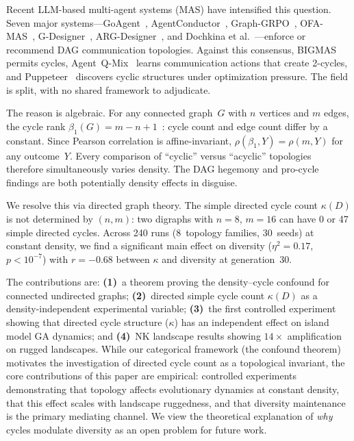 \documentclass{llncs}
\begin{document}
Recent LLM-based multi-agent systems (MAS) have intensified this question.
Seven major systems---GoAgent~\cite{goagent2026},
AgentConductor~\cite{agentconductor2026}, Graph-GRPO~\cite{graphgrpo2026},
OFA-MAS~\cite{ofamas2026}, G-Designer~\cite{gdesigner2025},
ARG-Designer~\cite{argdesigner2026}, and Dochkina et
al.~\cite{dochkina2026}---enforce or recommend DAG communication topologies.
Against this consensus, BIGMAS~\cite{bigmas2026} permits cycles,
Agent~Q-Mix~\cite{agentqmix2026} learns communication actions that create
2-cycles, and Puppeteer~\cite{puppeteer2025} discovers cyclic structures under
optimization pressure. The field is split, with no shared framework to
adjudicate.

The reason is algebraic. For any connected graph~$G$ with $n$ vertices and $m$
edges, the cycle rank $\beta_1(G) = m - n + 1$~\cite{hatcher2002algebraic}:
cycle count and edge count differ by a constant. Since Pearson correlation is
affine-invariant, $\rho(\beta_1, Y) = \rho(m, Y)$ for any outcome~$Y$. Every
comparison of ``cyclic'' versus ``acyclic'' topologies therefore simultaneously
varies density. The DAG hegemony and pro-cycle findings are both potentially
density effects in disguise.

We resolve this via directed graph theory. The simple directed cycle count
$\kappa(D)$ is not determined by $(n, m)$: two digraphs with $n = 8$, $m = 16$
can have 0 or 47 simple directed cycles. Across 240 runs (8~topology families,
30~seeds) at constant density, we find a significant main effect on diversity
($\eta^2 = 0.17$, $p < 10^{-7}$) with $r = -0.68$ between $\kappa$ and
diversity at generation~30.

The contributions are: \textbf{(1)}~a theorem proving the density--cycle
confound for connected undirected graphs; \textbf{(2)}~directed simple
cycle count $\kappa(D)$ as a density-independent experimental variable;
\textbf{(3)}~the first controlled experiment showing that directed cycle
structure ($\kappa$) has an independent effect on island model GA dynamics; and
\textbf{(4)}~NK landscape results showing $14\times$ amplification on
rugged landscapes.
While our categorical framework (the confound theorem) motivates the
investigation of directed cycle count as a topological invariant, the core
contributions of this paper are empirical: controlled experiments demonstrating
that topology affects evolutionary dynamics at constant density, that this
effect scales with landscape ruggedness, and that diversity maintenance is the
primary mediating channel. We view the theoretical explanation of \emph{why}
cycles modulate diversity as an open problem for future work.
\end{document}
